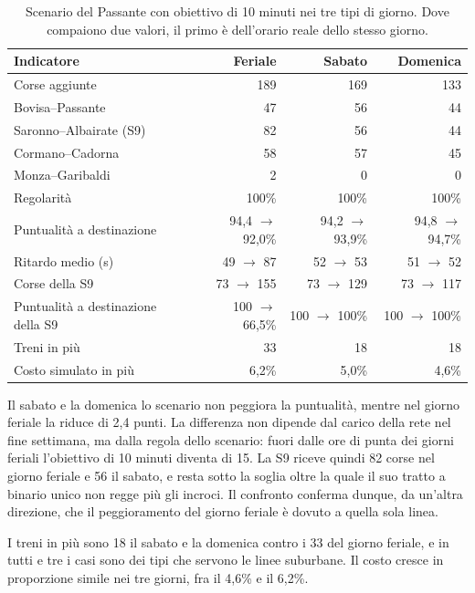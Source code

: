 \begin{table}[H]
	\centering
	\caption{Scenario del Passante con obiettivo di 10 minuti nei tre tipi di giorno. Dove compaiono due valori, il primo è dell'orario reale dello stesso giorno.}
	\label{tab:risultati-passante-giorni}
	\begin{tabularx}{\textwidth}{Xrrr}
		\toprule
		Indicatore & Feriale & Sabato & Domenica \\
		\midrule
		Corse aggiunte & 189 & 169 & 133 \\
		\quad Bovisa--Passante & 47 & 56 & 44 \\
		\quad Saronno--Albairate (S9) & 82 & 56 & 44 \\
		\quad Cormano--Cadorna & 58 & 57 & 45 \\
		\quad Monza--Garibaldi & 2 & 0 & 0 \\
		\midrule
		Regolarità & 100\% & 100\% & 100\% \\
		Puntualità a destinazione & 94,4 $\rightarrow$ 92,0\% & 94,2 $\rightarrow$ 93,9\% & 94,8 $\rightarrow$ 94,7\% \\
		Ritardo medio (s) & 49 $\rightarrow$ 87 & 52 $\rightarrow$ 53 & 51 $\rightarrow$ 52 \\
		Corse della S9 & 73 $\rightarrow$ 155 & 73 $\rightarrow$ 129 & 73 $\rightarrow$ 117 \\
		Puntualità a destinazione della S9 & 100 $\rightarrow$ 66,5\% & 100 $\rightarrow$ 100\% & 100 $\rightarrow$ 100\% \\
		\midrule
		Treni in più & 33 & 18 & 18 \\
		Costo simulato in più & 6,2\% & 5,0\% & 4,6\% \\
		\bottomrule
	\end{tabularx}
\end{table}

Il sabato e la domenica lo scenario non peggiora la puntualità, mentre nel giorno feriale la riduce di 2,4 punti. La differenza non dipende dal carico della rete nel fine settimana, ma dalla regola dello scenario: fuori dalle ore di punta dei giorni feriali l'obiettivo di 10 minuti diventa di 15. La S9 riceve quindi 82 corse nel giorno feriale e 56 il sabato, e resta sotto la soglia oltre la quale il suo tratto a binario unico non regge più gli incroci. Il confronto conferma dunque, da un'altra direzione, che il peggioramento del giorno feriale è dovuto a quella sola linea.

I treni in più sono 18 il sabato e la domenica contro i 33 del giorno feriale, e in tutti e tre i casi sono dei tipi che servono le linee suburbane. Il costo cresce in proporzione simile nei tre giorni, fra il 4,6\% e il 6,2\%.

